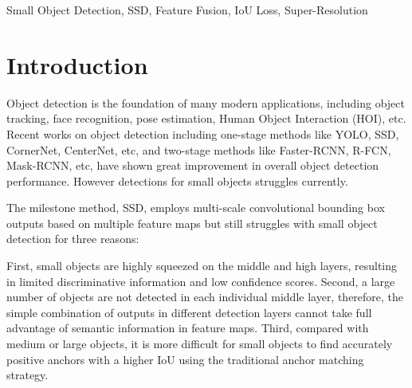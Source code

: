 \documentclass[journal,conference]{IEEEtran}
\begin{document}
\begin{IEEEkeywords}
  Small Object Detection, SSD, Feature Fusion, IoU Loss, Super-Resolution
\end{IEEEkeywords}


\IEEEpeerreviewmaketitle



\section{Introduction}
Object detection is the foundation of many modern applications, including object tracking, face recognition, pose estimation, Human Object Interaction (HOI), etc. Recent works on object detection including one-stage methods like YOLO, SSD, CornerNet, CenterNet, etc, and two-stage methods like Faster-RCNN, R-FCN, Mask-RCNN, etc, have shown great improvement in overall object detection performance. However detections for small objects struggles currently.

The milestone method, SSD, employs multi-scale convolutional bounding box outputs based on multiple feature maps but still struggles with small object detection for three reasons:

First, small objects are highly squeezed on the middle and high layers, resulting in limited discriminative information and low confidence scores.
Second, a large number of objects are not detected in each individual middle layer, therefore, the simple combination of outputs in different detection layers cannot take full advantage of semantic information in feature maps. Third, compared with medium or large objects, it is more difficult for small objects to find accurately positive anchors with a higher IoU using the traditional anchor matching strategy.

\end{document}
